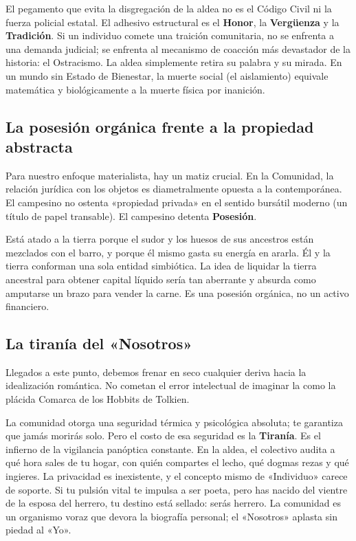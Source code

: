 El pegamento que evita la disgregación de la aldea no es el Código Civil ni la fuerza policial estatal. El adhesivo estructural es el \textbf{Honor}, la \textbf{Vergüenza} y la \textbf{Tradición}. Si un individuo comete una traición comunitaria, no se enfrenta a una demanda judicial; se enfrenta al mecanismo de coacción más devastador de la historia: el Ostracismo. La aldea simplemente retira su palabra y su mirada. En un mundo sin Estado de Bienestar, la muerte social (el aislamiento) equivale matemática y biológicamente a la muerte física por inanición.

\subsection{La posesión orgánica frente a la propiedad abstracta}
Para nuestro enfoque materialista, hay un matiz crucial. En la Comunidad, la relación jurídica con los objetos es diametralmente opuesta a la contemporánea. El campesino no ostenta «propiedad privada» en el sentido bursátil moderno (un título de papel transable). El campesino detenta \textbf{Posesión}. 

Está atado a la tierra porque el sudor y los huesos de sus ancestros están mezclados con el barro, y porque él mismo gasta su energía en ararla. Él y la tierra conforman una sola entidad simbiótica. La idea de liquidar la tierra ancestral para obtener capital líquido sería tan aberrante y absurda como amputarse un brazo para vender la carne. Es una posesión orgánica, no un activo financiero.

\subsection{La tiranía del «Nosotros»}
Llegados a este punto, debemos frenar en seco cualquier deriva hacia la idealización romántica. No cometan el error intelectual de imaginar la \Gemeinschaft{} como la plácida Comarca de los Hobbits de Tolkien. 

La comunidad otorga una seguridad térmica y psicológica absoluta; te garantiza que jamás morirás solo. Pero el costo de esa seguridad es la \textbf{Tiranía}. Es el infierno de la vigilancia panóptica constante. En la aldea, el colectivo audita a qué hora sales de tu hogar, con quién compartes el lecho, qué dogmas rezas y qué ingieres. La privacidad es inexistente, y el concepto mismo de «Individuo» carece de soporte. Si tu pulsión vital te impulsa a ser poeta, pero has nacido del vientre de la esposa del herrero, tu destino está sellado: serás herrero. La comunidad es un organismo voraz que devora la biografía personal; el «Nosotros» aplasta sin piedad al «Yo».


